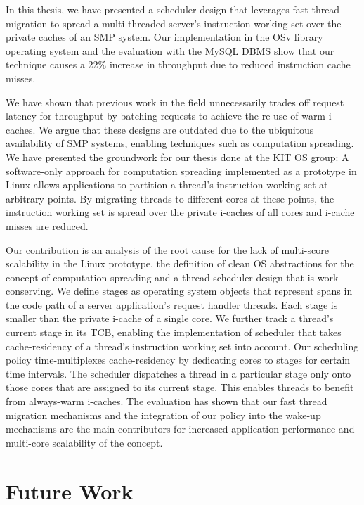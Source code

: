 \documentclass[12pt,a4paper]{book}
\begin{document}
In this thesis, we have presented a scheduler design that leverages fast thread migration to spread a multi-threaded server's instruction working set over the private caches of an SMP system.
Our implementation in the OSv library operating system and the evaluation with the MySQL DBMS show that our technique causes a 22\% increase in throughput due to reduced instruction cache misses.

We have shown that previous work in the field unnecessarily trades off request latency for throughput by batching requests to achieve the re-use of warm i-caches.
We argue that these designs are outdated due to the ubiquitous availability of SMP systems, enabling techniques such as computation spreading.
We have presented the groundwork for our thesis done at the KIT OS group:
A software-only approach for computation spreading implemented as a prototype in Linux allows applications to partition a thread's instruction working set at arbitrary points.
By migrating threads to different cores at these points, the instruction working set is spread over the private i-caches of all cores and i-cache misses are reduced.

Our contribution is an analysis of the root cause for the lack of multi-score scalability in the Linux prototype,
the definition of clean OS abstractions for the concept of computation spreading and
a thread scheduler design that is work-conserving.
We define stages as operating system objects that represent spans in the code path of a server application's request handler threads.
Each stage is smaller than the private i-cache of a single core.
We further track a thread's current stage in its TCB, enabling the implementation of scheduler that takes cache-residency of a thread's instruction working set into account.
Our scheduling policy time-multiplexes cache-residency by dedicating cores to stages for certain time intervals.
The scheduler dispatches a thread in a particular stage only onto those cores that are assigned to its current stage.
This enables threads to benefit from always-warm i-caches.
The evaluation has shown that our fast thread migration mechanisms and the integration of our policy into the wake-up mechanisms are the main contributors for increased application performance and multi-core scalability of the concept.

\section{Future Work}
\end{document}
